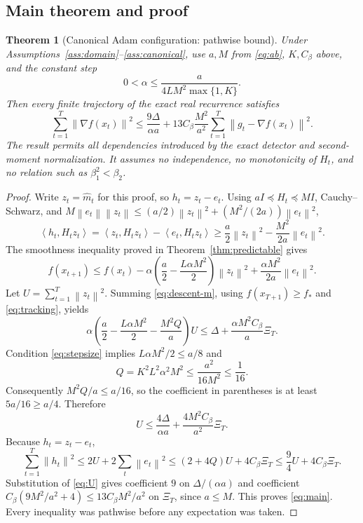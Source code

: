 \documentclass[11pt]{article}
\newtheorem{theorem}{Theorem}[section]
\theoremstyle{definition}
\theoremstyle{remark}
\newcommand{\norm}[1]{\left\lVert#1\right\rVert}
\newcommand{\ip}[2]{\left\langle#1,#2\right\rangle}
\begin{document}
\subsection{Main theorem and proof}
\begin{theorem}[Canonical Adam configuration: pathwise bound]\label{thm:main}
Under Assumptions~\ref{ass:domain}--\ref{ass:canonical}, use $a,M$ from
\eqref{eq:ab}, $K,C_\beta$ above, and the constant step
\begin{equation}\label{eq:stepsize}
 0<\alpha\le\frac{a}{4LM^2\max\{1,K\}}.
\end{equation}
Then every finite trajectory of the exact real recurrence satisfies
\begin{equation}\label{eq:main}
 \sum_{t=1}^T\norm{\nabla f(x_t)}^2
 \le \frac{9\Delta}{\alpha a}
       +13C_\beta\frac{M^2}{a^2}\sum_{t=1}^T\norm{g_t-\nabla f(x_t)}^2.
\end{equation}
The result permits all dependencies introduced by the exact detector and
second-moment normalization. It assumes no independence, no monotonicity of
$H_t$, and no relation such as $\beta_1^2<\beta_2$.
\end{theorem}
\begin{proof}
Write $z_t=\widehat m_t$ for this proof, so $h_t=z_t-e_t$.
Using $aI\preceq H_t\preceq MI$, Cauchy--Schwarz, and
$M\norm{e_t}\norm{z_t}\le(a/2)\norm{z_t}^2+(M^2/(2a))\norm{e_t}^2$,
\[
 \ip{h_t}{H_tz_t}
 =\ip{z_t}{H_tz_t}-\ip{e_t}{H_tz_t}
 \ge\frac a2\norm{z_t}^2-\frac{M^2}{2a}\norm{e_t}^2.
\]
The smoothness inequality proved in Theorem~\ref{thm:predictable} gives
\begin{equation}\label{eq:descent-m}
 f(x_{t+1})\le f(x_t)
 -\alpha\left(\frac a2-\frac{L\alpha M^2}{2}\right)\norm{z_t}^2
 +\frac{\alpha M^2}{2a}\norm{e_t}^2.
\end{equation}
Let $U=\sum_{t=1}^T\norm{z_t}^2$. Summing \eqref{eq:descent-m}, using
$f(x_{T+1})\ge f_*$ and \eqref{eq:tracking}, yields
\begin{equation}\label{eq:absorb}
 \alpha\left(\frac a2-\frac{L\alpha M^2}{2}-\frac{M^2Q}{a}\right)U
 \le \Delta+\frac{\alpha M^2C_\beta}{a}\Xi_T.
\end{equation}
Condition \eqref{eq:stepsize} implies
$L\alpha M^2/2\le a/8$ and
\[
 Q=K^2L^2\alpha^2M^2\le\frac{a^2}{16M^2}\le\frac1{16}.
\]
Consequently $M^2Q/a\le a/16$, so the coefficient in parentheses is at least
$5a/16\ge a/4$. Therefore
\begin{equation}\label{eq:U}
 U\le\frac{4\Delta}{\alpha a}+\frac{4M^2C_\beta}{a^2}\Xi_T.
\end{equation}
Because $h_t=z_t-e_t$,
\[
 \sum_{t=1}^T\norm{h_t}^2
 \le2U+2\sum_t\norm{e_t}^2
 \le(2+4Q)U+4C_\beta\Xi_T
 \le\frac94 U+4C_\beta\Xi_T.
\]
Substitution of \eqref{eq:U} gives coefficient $9$ on
$\Delta/(\alpha a)$ and coefficient
$C_\beta(9M^2/a^2+4)\le13C_\beta M^2/a^2$ on $\Xi_T$,
since $a\le M$. This proves \eqref{eq:main}.
Every inequality was pathwise before any expectation was taken.
\end{proof}
\end{document}
